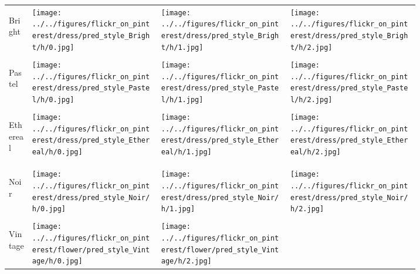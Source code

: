 \newcommand{\dgap}{.42in}
\begin{figure}
\begin{subfigure}[t]{0.48\linewidth}
    \begin{tabular}{m{.02in}|m{\dgap} m{\dgap} m{\dgap}}
    \begin{turn}{90}\small{Bright}\end{turn} &
    \texttt{[image: ../../figures/flickr\_on\_pinterest/dress/pred\_style\_Bright/h/0.jpg]} &
    \texttt{[image: ../../figures/flickr\_on\_pinterest/dress/pred\_style\_Bright/h/1.jpg]} &
    \texttt{[image: ../../figures/flickr\_on\_pinterest/dress/pred\_style\_Bright/h/2.jpg]} \\ \\
    \begin{turn}{90}\small{Pastel}\end{turn} &
    \texttt{[image: ../../figures/flickr\_on\_pinterest/dress/pred\_style\_Pastel/h/0.jpg]} &
    \texttt{[image: ../../figures/flickr\_on\_pinterest/dress/pred\_style\_Pastel/h/1.jpg]} &
    \texttt{[image: ../../figures/flickr\_on\_pinterest/dress/pred\_style\_Pastel/h/2.jpg]} \\ \\
    \begin{turn}{90}\small{Ethereal}\end{turn} &
    \texttt{[image: ../../figures/flickr\_on\_pinterest/dress/pred\_style\_Ethereal/h/0.jpg]} &
    \texttt{[image: ../../figures/flickr\_on\_pinterest/dress/pred\_style\_Ethereal/h/1.jpg]} &
    \texttt{[image: ../../figures/flickr\_on\_pinterest/dress/pred\_style\_Ethereal/h/2.jpg]} \\ \\
    \begin{turn}{90}\small{Noir}\end{turn} &
    \texttt{[image: ../../figures/flickr\_on\_pinterest/dress/pred\_style\_Noir/h/0.jpg]} &
    \texttt{[image: ../../figures/flickr\_on\_pinterest/dress/pred\_style\_Noir/h/1.jpg]} &
    \texttt{[image: ../../figures/flickr\_on\_pinterest/dress/pred\_style\_Noir/h/2.jpg]} \\ \\
    \begin{turn}{90}\small{Vintage}\end{turn} &
    \texttt{[image: ../../figures/flickr\_on\_pinterest/flower/pred\_style\_Vintage/h/0.jpg]} &
    \texttt{[image: ../../figures/flickr\_on\_pinterest/flower/pred\_style\_Vintage/h/2.jpg]} &

\end{tabular}
\end{subfigure}
\end{figure}
